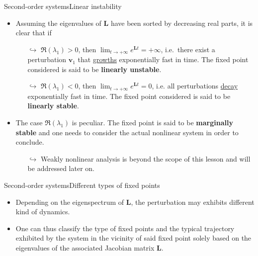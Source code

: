 \documentclass[usenames,dvipsnames,svgnames,10pt,aspectratio=169]{beamer}
\begin{document}
\begin{frame}[t, c]{Second-order systems}{Linear instability}
	\begin{itemize}
		\item Assuming the eigenvalues of ${\bm L}$ have been sorted by decreasing real parts, it is clear that if

		\begin{itemize}
			\item[$\hookrightarrow$] $\Re(\lambda_1) > 0$, then $\lim_{t \to +\infty} e^{{\bm L} t} = + \infty$, i.e.\ there exist a perturbation ${\bm v}_1$ that \underline{growths} exponentially fast in time. The fixed point considered is said to be \alert{\textbf{linearly unstable}}.

			\medskip

			\item[$\hookrightarrow$] $\Re(\lambda_1) < 0$, then $\lim_{t \to +\infty} e^{{\bm L} t} = 0$, i.e. all perturbations \underline{decay} exponentially fast in time. The fixed point considered is said to be \alert{\textbf{linearly stable}}.

		\end{itemize}

		\bigskip

		\item The case $\Re(\lambda_1)$ is peculiar. The fixed point is said to be \alert{\textbf{marginally stable}} and one needs to consider the actual nonlinear system in order to conclude.
		\begin{itemize}
			\item[$\hookrightarrow$] Weakly nonlinear analysis is beyond the scope of this lesson and will be addressed later on.
		\end{itemize}
	\end{itemize}

	\vspace{1cm}
\end{frame}

\begin{frame}[t, c]{Second-order systems}{Different types of fixed points}
	\begin{itemize}
		\item Depending on the eigenspectrum of ${\bm L}$, the perturbation may exhibits different kind of dynamics.

		\bigskip

		\item One can thus classify the type of fixed points and the typical trajectory exhibited by the system in the vicinity of said fixed point solely based on the eigenvalues of the associated Jacobian matrix ${\bm L}$.
	\end{itemize}

	\vspace{1cm}
\end{frame}
\end{document}
